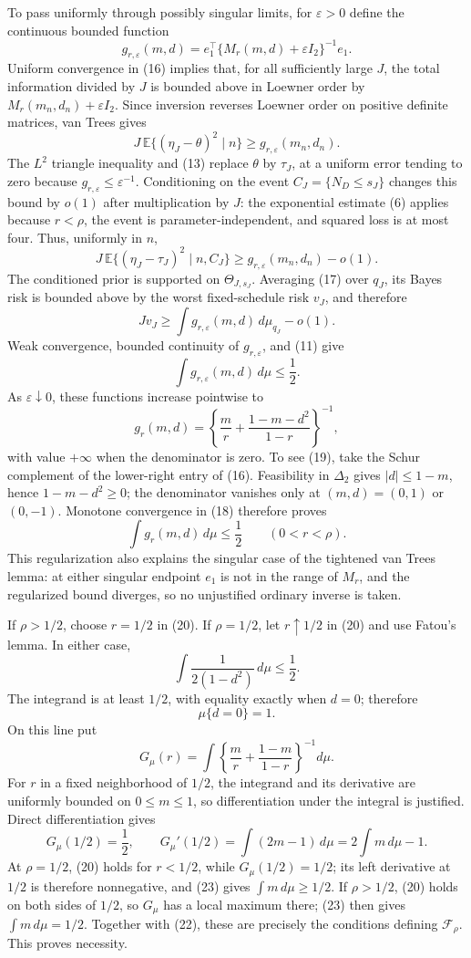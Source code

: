To pass uniformly through possibly singular limits, for \(\varepsilon>0\) define the continuous bounded function
\[
 g_{r,\varepsilon}(m,d)
 =e_1^{\!\top}\{M_r(m,d)+\varepsilon I_2\}^{-1}e_1.
\]
Uniform convergence in (16) implies that, for all sufficiently large \(J\), the total information divided by \(J\) is bounded above in Loewner order by \(M_r(m_n,d_n)+\varepsilon I_2\).  Since inversion reverses Loewner order on positive definite matrices, van Trees gives
\[
 J\,\mathbb E\{(\eta_J-\theta)^2\mid n\}
 \ge g_{r,\varepsilon}(m_n,d_n).
\]
The \(L^2\) triangle inequality and (13) replace \(\theta\) by \(\tau_J\), at a uniform error tending to zero because \(g_{r,\varepsilon}\le\varepsilon^{-1}\).  Conditioning on the event \(C_J=\{N_D\le s_J\}\) changes this bound by \(o(1)\) after multiplication by \(J\): the exponential estimate (6) applies because \(r<\rho\), the event is parameter-independent, and squared loss is at most four.  Thus, uniformly in \(n\),
\[
 J\,\mathbb E\{(\eta_J-\tau_J)^2\mid n,C_J\}
 \ge g_{r,\varepsilon}(m_n,d_n)-o(1).
 \tag{17}
\]
The conditioned prior is supported on \(\Theta_{J,s_J}\).  Averaging (17) over \(q_J\), its Bayes risk is bounded above by the worst fixed-schedule risk \(v_J\), and therefore
\[
 Jv_J\ge\int g_{r,\varepsilon}(m,d)\,d\mu_{q_J}-o(1).
 \tag{18}
\]
Weak convergence, bounded continuity of \(g_{r,\varepsilon}\), and (11) give
\[
 \int g_{r,\varepsilon}(m,d)\,d\mu\le\frac12.
\]
As \(\varepsilon\downarrow0\), these functions increase pointwise to
\[
 g_r(m,d)=
 \left\{\frac m r+\frac{1-m-d^2}{1-r}\right\}^{-1},
 \tag{19}
\]
with value \(+\infty\) when the denominator is zero.  To see (19), take the Schur complement of the lower-right entry of (16).  Feasibility in \(\Delta_2\) gives \(|d|\le1-m\), hence \(1-m-d^2\ge0\); the denominator vanishes only at \((m,d)=(0,1)\) or \((0,-1)\).  Monotone convergence in (18) therefore proves
\[
 \int g_r(m,d)\,d\mu\le\frac12
 \qquad(0<r<\rho).
 \tag{20}
\]
This regularization also explains the singular case of the tightened van Trees lemma: at either singular endpoint \(e_1\) is not in the range of \(M_r\), and the regularized bound diverges, so no unjustified ordinary inverse is taken.

If \(\rho>1/2\), choose \(r=1/2\) in (20).  If \(\rho=1/2\), let \(r\uparrow1/2\) in (20) and use Fatou's lemma.  In either case,
\[
 \int\frac1{2(1-d^2)}\,d\mu\le\frac12.
 \tag{21}
\]
The integrand is at least \(1/2\), with equality exactly when \(d=0\); therefore
\[
 \mu\{d=0\}=1.
 \tag{22}
\]
On this line put
\[
 G_\mu(r)=\int
 \left\{\frac m r+\frac{1-m}{1-r}\right\}^{-1}d\mu.
\]
For \(r\) in a fixed neighborhood of \(1/2\), the integrand and its derivative are uniformly bounded on \(0\le m\le1\), so differentiation under the integral is justified.  Direct differentiation gives
\[
 G_\mu(1/2)=\frac12,
 \qquad
 G_\mu'(1/2)=\int(2m-1)\,d\mu
 =2\int m\,d\mu-1.
 \tag{23}
\]
At \(\rho=1/2\), (20) holds for \(r<1/2\), while \(G_\mu(1/2)=1/2\); its left derivative at \(1/2\) is therefore nonnegative, and (23) gives \(\int m\,d\mu\ge1/2\).  If \(\rho>1/2\), (20) holds on both sides of \(1/2\), so \(G_\mu\) has a local maximum there; (23) then gives \(\int m\,d\mu=1/2\).  Together with (22), these are precisely the conditions defining \(\mathcal F_\rho\).  This proves necessity.


